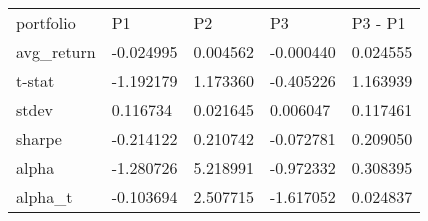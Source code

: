 \begin{tabular}{lllll}
\toprule
\midrule
portfolio & P1 & P2 & P3 & P3 - P1 \\
avg_return & -0.024995 & 0.004562 & -0.000440 & 0.024555 \\
t-stat & -1.192179 & 1.173360 & -0.405226 & 1.163939 \\
stdev & 0.116734 & 0.021645 & 0.006047 & 0.117461 \\
sharpe & -0.214122 & 0.210742 & -0.072781 & 0.209050 \\
alpha & -1.280726 & 5.218991 & -0.972332 & 0.308395 \\
alpha_t & -0.103694 & 2.507715 & -1.617052 & 0.024837 \\
\bottomrule
\end{tabular}
